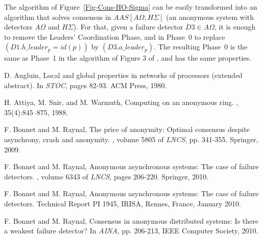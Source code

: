 \documentclass[10pt, conference, compsocconf]{IEEEtran}
\newcommand{\AO}{{A\Omega}}
\newcommand{\HS}{{H\Sigma}}
\begin{document}
The algorithm of Figure~\ref{Fig-Cons-HO-Sigma} can be easily transformed into an algorithm that solves consensus in 
$\mathit{AAS}[\AO,\HS]$ (an anonymous system with detectors $\AO$ and $\HS$).
For that, given a failure detector $D3 \in \AO$, it is enough to remove the Leaders' Coordination Phase, 
and in Phase~0 to replace $(D1.h\_leader_p=id(p))$ by $(D3.a\_leader_p)$. The resulting Phase~0 is the same as Phase~1 in the algorithm of Figure 3 of \cite{DBLP:conf/wdag/BonnetR10}, and has the same properties.













\begin{thebibliography}{10}\setlength{\itemsep}{0in}

{\small 



D. Angluin,
\newblock Local and global properties in networks of processors (extended
  abstract).
\newblock In {\em STOC}, pages 82-93. ACM Press, 1980.




H. Attiya, M. Snir, and M. Warmuth,
\newblock Computing on an anonymous ring.
, 35(4):845--875, 1988.





F. Bonnet and M. Raynal,
\newblock The price of anonymity: Optimal consensus despite asynchrony, crash
  and anonymity.
, volume 5805 of {\em LNCS}, pp. 341-355. Springer, 2009.

F.  Bonnet and M. Raynal,
\newblock Anonymous asynchronous systems: The case of failure detectors.
,
  volume 6343 of {\em LNCS}, pages 206-220. Springer, 2010.

F. Bonnet and M. Raynal,
\newblock Anonymous asynchronous systems: The case of failure detectors.
\newblock Technical Report PI 1945, IRISA, Rennes, France, January 2010.

F.  Bonnet and M. Raynal,
\newblock Consensus in anonymous distributed systems: Is there a weakest
  failure detector?
\newblock In {\em AINA}, pp. 206-213, IEEE Computer Society, 2010.

}
\end{thebibliography}
\end{document}
